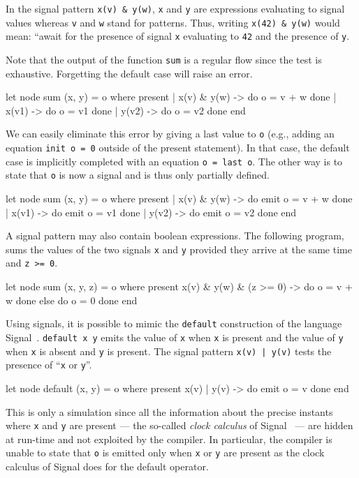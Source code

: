 \documentclass[11pt,titlepage,twoside]{report}
\newcommand{\signal}{{\sf Signal}}
\newcommand{\Remark}{\medskip\noindent{\bf Remark: }}
\begin{document}
In the signal pattern \verb-x(v) & y(w)-, \verb-x- and \verb-y- are
expressions evaluating to signal values whereas \verb-v- and \verb-w-
stand for patterns. Thus, writing \verb-x(42) & y(w)- would mean:
``await for the presence of signal \verb-x- evaluating to \verb-42-
and the presence of \verb-y-.

Note that the output of the function \verb-sum- is a regular flow
since the test is exhaustive. Forgetting the default case will raise
an error.
\begin{runverbatim}
let node sum (x, y) = o where
  present
  | x(v) & y(w) -> do o = v + w done
  | x(v1) -> do o = v1 done
  | y(v2) -> do o = v2 done
  end
\end{runverbatim}

We can easily eliminate this error by giving a last value to \verb-o-
(e.g., adding an equation \verb-init o = 0- outside of the present
statement). In that case, the default case is implicitly completed
with an equation \verb-o = last o-. The other way is to state that
\verb-o- is now a signal and is thus only partially defined.
\begin{runverbatim}[withresult]
let node sum (x, y) = o where
  present
  | x(v) & y(w) -> do emit o = v + w done
  | x(v1) -> do emit o = v1 done
  | y(v2) -> do emit o = v2 done
  end
\end{runverbatim}

A signal pattern may also contain boolean expressions. The following
program, sums the values of the two signals \verb-x- and \verb-y-
provided they arrive at the same time and \verb-z >= 0-.
\begin{runverbatim}
let node sum (x, y, z) = o where
  present
    x(v) & y(w) & (z >= 0) -> do o = v + w done
  else do o = 0 done
  end
\end{runverbatim}

\Remark Using signals, it is possible
to mimic the
\verb-default- construction of the language
\signal~\cite{signal:scp91}. \verb-default x y- emits the value of \verb-x- when \verb-x-
is present and the value of \verb-y- when \verb-x- is absent and
\verb-y- is present. The signal pattern \verb+x(v) | y(v)+ tests the
presence of ``\verb-x- or \verb-y-''.
\begin{runverbatim}
let node default (x, y) = o where
  present
    x(v) | y(v) -> do emit o = v done
  end
\end{runverbatim}
This is only a simulation since all the information about the precise
instants where \verb-x- and \verb-y- are present --- the so-called
\emph{clock calculus} of \signal~\cite{signal:scp91} --- are hidden at
run-time and not exploited by the compiler. In particular, the
compiler is unable to state that \verb-o- is emitted only when
\verb-x- or \verb-y- are present as the clock calculus of
\signal{} does for the default operator.
\end{document}
